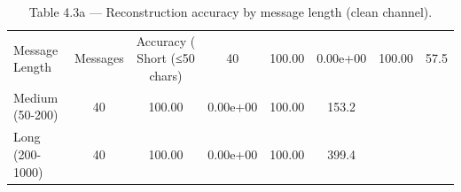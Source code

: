 \begin{table}[htbp]
\centering
\caption{Table 4.3a — Reconstruction accuracy by message length (clean channel).}
\label{tab:table_4_3_reconstruction}
\begin{tabular}{lccccc}
\hline
Message Length & Messages & Accuracy (%
\hline
Short (≤50 chars) & 40 & 100.00 & 0.00e+00 & 100.00 & 57.5 \\
Medium (50-200) & 40 & 100.00 & 0.00e+00 & 100.00 & 153.2 \\
Long (200-1000) & 40 & 100.00 & 0.00e+00 & 100.00 & 399.4 \\
\hline
\end{tabular}
\end{table}
